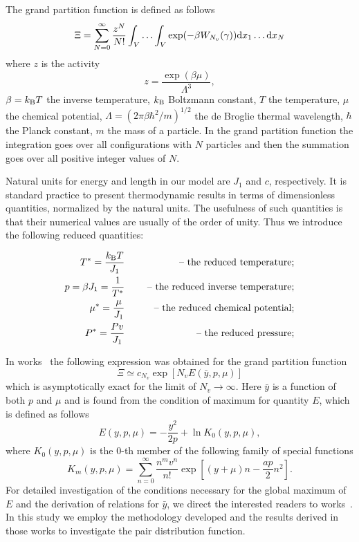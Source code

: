 The grand partition function is defined as follows
\begin{equation*}
	\Xi = \sum_{N=0}^{\infty}\frac{z^N}{N!} \int_{V} \dotsc \int_{V} \exp(-\beta W_{N_v}(\gamma)) {\rm d} x_1 \dotsc {\rm d} x_N
\end{equation*}
where $z$ is the activity
\begin{equation*}
	z = \frac{\exp(\beta \mu)}{\Lambda^3},
\end{equation*}
$\beta = k_{\rm B} T$ the inverse temperature, $k_{\rm B}$ Boltzmann constant, $T$ the temperature, $\mu$ the chemical potential, $\Lambda = (2\pi\beta\hbar^2/m)^{1/2}$ the de Broglie thermal wavelength, $\hbar$ the Planck constant, $m$ the mass of a particle. In the grand partition function the integration goes over all configurations with $N$ particles and then the summation goes over all positive integer values of $N$.

Natural units for energy and length in our model are $J_1$ and $c$, respectively. It is standard practice to present thermodynamic results in terms of dimensionless quantities, normalized by the natural units. The usefulness of such quantities is that their numerical values are usually of the order of unity. Thus we introduce the following reduced quantities: 

\begin{eqnarray*}
	T^* = \frac{k_{\rm B} T}{J_1} & \quad & \text{ -- the reduced temperature;} 
	\\
	p = \beta J_1 = \frac{1}{T^*} & \quad & \text{ -- the reduced inverse temperature;}
	\\
	\mu^* = \frac{\mu}{J_1} & \quad & \text{ -- the reduced chemical potential;}
	\\ 
	P^* = \frac{Pv}{J_1} & & \text{ -- the reduced pressure;}
\end{eqnarray*}

In works~\cite{KKD2018book,KKD2020} the following expression was obtained for the grand partition function
\begin{equation}
	\Xi \simeq c_{N_v} \exp[N_v E(\bar{y}, p, \mu)]
\end{equation}
which is asymptotically exact for the limit of $N_v \to \infty$. Here $\bar{y}$ is a function of both $p$ and $\mu$ and is found from the condition of maximum for quantity $E$, which is defined as follows
\begin{equation*}
	E(y, p, \mu) = -\frac{y^2}{2p} + \ln K_0(y,p,\mu),
\end{equation*}
where $K_0(y,p,\mu)$ is the $0$-th member of the following family of special functions
\begin{equation*}
	K_m(y,p,\mu) = \sum_{n=0}^{\infty} \frac{n^m v^n}{n!} \exp[(y+\mu)n - \frac{a p}{2}n^2].
\end{equation*}
For detailed investigation of the conditions necessary for the global maximum of $E$ and the derivation of relations for $\bar{y}$, we direct the interested readers to works~\cite{KKD2018book,KKD2020,MpkDob2022}. In this study we employ the methodology developed and the results derived in those works to investigate the pair distribution function. 
